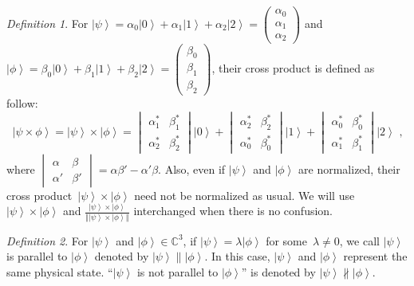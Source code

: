 \documentclass{article}
\theoremstyle{remark}
\newtheorem{definition}{Definition}
\newcommand{\ket}[1]{{\left\vert{#1}\right\rangle}}
\begin{document}
\begin{definition}For $\ket{\psi}=\alpha_{0}\ket{0}+\alpha_{1}\ket{1}+\alpha_{2}\ket{2}=\begin{pmatrix}\alpha_{0}\\
\alpha_{1}\\
\alpha_{2}
\end{pmatrix}$ and $\ket{\phi}=\beta_{0}\ket{0}+\beta_{1}\ket{1}+\beta_{2}\ket{2}=\begin{pmatrix}\beta_{0}\\
\beta_{1}\\
\beta_{2}
\end{pmatrix}$, their cross product is defined as follow: 
\[
\ket{\psi\times\phi}=\ket{\psi}\times\ket{\phi}=\begin{vmatrix}\alpha_{1}^{*} & \beta_{1}^{*}\\
\alpha_{2}^{*} & \beta_{2}^{*}
\end{vmatrix}\ket{0}+\begin{vmatrix}\alpha_{2}^{*} & \beta_{2}^{*}\\
\alpha_{0}^{*} & \beta_{0}^{*}
\end{vmatrix}\ket{1}+\begin{vmatrix}\alpha_{0}^{*} & \beta_{0}^{*}\\
\alpha_{1}^{*} & \beta_{1}^{*}
\end{vmatrix}\ket{2}\textrm{ ,}
\]
where $\begin{vmatrix}\alpha & \beta\\
\alpha' & \beta'
\end{vmatrix}=\alpha\beta'-\alpha'\beta$. Also, even if $\ket{\psi}$ and $\ket{\phi}$ are normalized, their
cross product~$\ket{\psi}\times\ket{\phi}$ need not be normalized
as usual. We will use $\ket{\psi}\times\ket{\phi}$ and $\frac{\ket{\psi}\times\ket{\phi}}{\left\Vert \ket{\psi}\times\ket{\phi}\right\Vert }$
interchanged when there is no confusion.\end{definition}

\begin{definition}For $\ket{\psi}$ and $\ket{\phi}\in\mathbb{C}^{3}$,
if $\ket{\psi}=\lambda\ket{\phi}$ for some~$\lambda\ne0$, we call
$\ket{\psi}$ is parallel to $\ket{\phi}$ denoted by $\ket{\psi}\parallel\ket{\phi}$.
In this case, $\ket{\psi}$ and $\ket{\phi}$ represent the same physical
state. ``$\ket{\psi}$ is not parallel to $\ket{\phi}$'' is denoted
by $\ket{\psi}\nparallel\ket{\phi}$.\end{definition}
\end{document}

